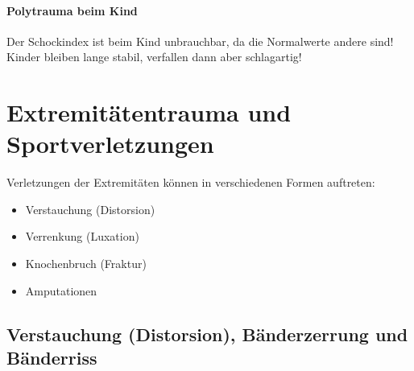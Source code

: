 


\paragraph{Polytrauma beim Kind} Der Schockindex ist beim Kind unbrauchbar, da die
Normalwerte andere sind! Kinder bleiben lange stabil, verfallen dann aber schlagartig!



\section{Extremitätentrauma und Sportverletzungen}
Verletzungen der Extremitäten können in verschiedenen Formen auftreten:
\begin{itemize}
  \item Verstauchung (Distorsion)
  \item Verrenkung (Luxation)
  \item Knochenbruch (Fraktur)
  \item Amputationen
\end{itemize}

\subsection{Verstauchung (Distorsion), Bänderzerrung und Bänderriss}


